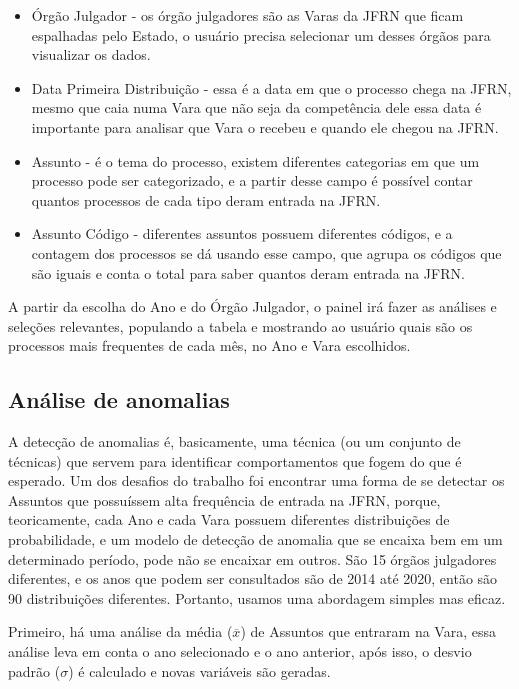 \begin{itemize}
	\item Órgão Julgador - os órgão julgadores são as Varas da JFRN que ficam espalhadas pelo Estado, o usuário precisa selecionar um desses órgãos para visualizar os dados.
	
	\item Data Primeira Distribuição - essa é a data em que o processo chega na JFRN, mesmo que caia numa Vara que não seja da competência dele essa data é importante para analisar que Vara o recebeu e quando ele chegou na JFRN.
	
	\item Assunto - é o tema do processo, existem diferentes categorias em que um processo pode ser categorizado, e a partir desse campo é possível contar quantos processos de cada tipo deram entrada na JFRN.
	
	\item Assunto Código - diferentes assuntos possuem diferentes códigos, e a contagem dos processos se dá usando esse campo, que agrupa os códigos que são iguais e conta o total para saber quantos deram entrada na JFRN.
\end{itemize} 

A partir da escolha do Ano e do Órgão Julgador, o painel irá fazer as análises e seleções relevantes, populando a tabela e mostrando ao usuário quais são os processos mais frequentes de cada mês, no Ano e Vara escolhidos.

\subsection{Análise de anomalias}

A detecção de anomalias é, basicamente, uma técnica (ou um conjunto de técnicas) que servem para identificar comportamentos que fogem do que é esperado. Um dos desafios do trabalho foi encontrar uma forma de se detectar os Assuntos que possuíssem alta frequência de entrada na JFRN, porque, teoricamente, cada Ano e cada Vara possuem diferentes distribuições de probabilidade, e um modelo de detecção de anomalia que se encaixa bem em um determinado período, pode não se encaixar em outros. São 15 órgãos julgadores diferentes, e os anos que podem ser consultados são de 2014 até 2020, então são 90 distribuições diferentes. Portanto, usamos uma abordagem simples mas eficaz.

Primeiro, há uma análise da média ($\overline{x}$) de Assuntos que entraram na Vara, essa análise leva em conta o ano selecionado e o ano anterior, após isso, o desvio padrão ($\sigma$) é calculado e novas variáveis são geradas.

